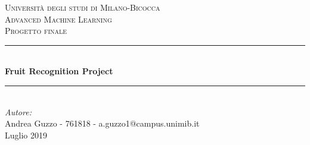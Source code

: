 \begin{titlepage}

\newcommand{\HRule}{\rule{\linewidth}{0.5mm}} %

\center %
 

\textsc{\LARGE Università degli studi di Milano-Bicocca}\\[1cm] %
\textsc{\Large Advanced Machine Learning }\\[0.3cm] %
\textsc{\large Progetto finale}\\[0.1cm] %


\HRule \\[0.4cm]
{ \huge \bfseries Fruit Recognition Project}\\[0.4cm] %
\HRule \\[1.5cm]
 

\large
\emph{Autore:}\\
Andrea Guzzo - 761818 - a.guzzo1@campus.unimib.it    %
 \\[1cm] 



Luglio 2019\\[2cm] %


\end{titlepage}
